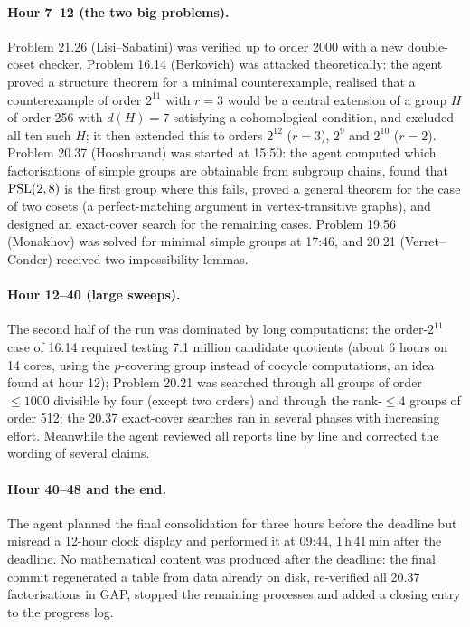 \paragraph{Hour 7--12 (the two big problems).} Problem 21.26 (Lisi--Sabatini) was verified up to order 2000 with a
new double-coset checker. Problem 16.14 (Berkovich) was attacked theoretically: the agent proved a structure
theorem for a minimal counterexample, realised that a counterexample
of order $2^{11}$ with $r=3$ would be a central extension of a group $H$ of order 256 with $d(H)=7$ satisfying a
cohomological condition, and excluded all ten such $H$; it then extended this to orders $2^{12}$ ($r=3$),
$2^9$ and $2^{10}$ ($r=2$). Problem 20.37 (Hooshmand)
was started at 15:50: the agent computed which factorisations of simple groups are obtainable from subgroup
chains, found that $\mathrm{PSL}(2,8)$ is the first group where this fails, proved a general theorem for the case of
two cosets (a perfect-matching argument in vertex-transitive graphs), and designed an exact-cover search for the
remaining cases. Problem 19.56 (Monakhov) was solved for minimal simple groups at 17:46, and 20.21
(Verret--Conder) received two impossibility lemmas.

\paragraph{Hour 12--40 (large sweeps).} The second half of the run was dominated by long computations: the
order-$2^{11}$ case of 16.14 required testing 7.1 million candidate quotients (about 6 hours on 14 cores, using the
$p$-covering group instead of cocycle computations, an idea found at hour 12); Problem 20.21 was searched
through all groups of order $\le 1000$ divisible by four (except two orders) and through the rank-$\le 4$ groups
of order 512; the 20.37 exact-cover searches ran in several phases with increasing effort. Meanwhile the agent
reviewed all reports line by line and corrected the wording of several claims.

\paragraph{Hour 40--48 and the end.} The agent planned the final consolidation for three hours before the
deadline but misread a 12-hour clock display and performed it at 09:44, 1\,h\,41\,min after the deadline. No
mathematical content was produced after the deadline: the final commit regenerated a table from data already on
disk, re-verified all 20.37 factorisations in GAP, stopped the remaining processes and added a closing entry to the
progress log.

